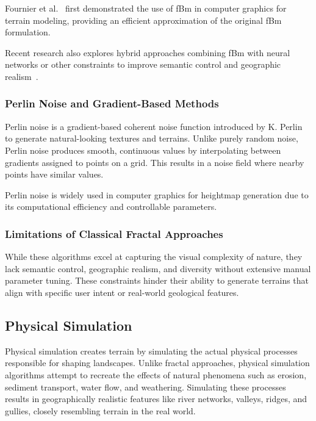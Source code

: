 Fournier et al.~\cite{fournier1982computer} first demonstrated the use of fBm in computer graphics for terrain modeling, providing an efficient approximation of the original fBm formulation.

Recent research also explores hybrid approaches combining fBm with neural networks or other constraints to improve semantic control and geographic realism~\cite{Cuadros2025TerrainGU}.

\subsubsection{Perlin Noise and Gradient-Based Methods}

Perlin noise is a gradient-based coherent noise function introduced by K. Perlin~\cite{perlin1985noise} to generate natural-looking textures and terrains. Unlike purely random noise, Perlin noise produces smooth, continuous values by interpolating between gradients assigned to points on a grid. This results in a noise field where nearby points have similar values.

Perlin noise is widely used in computer graphics for heightmap generation due to its computational efficiency and controllable parameters.

\subsubsection{Limitations of Classical Fractal Approaches}

While these algorithms excel at capturing the visual complexity of nature, they lack semantic control, geographic realism, and diversity without extensive manual parameter tuning. These constraints hinder their ability to generate terrains that align with specific user intent or real-world geological features.

\subsection{Physical Simulation}
\label{subsec:physical_simulation}

Physical simulation creates terrain by simulating the actual physical processes responsible for shaping landscapes. Unlike fractal approaches, physical simulation algorithms attempt to recreate the effects of natural phenomena such as erosion, sediment transport, water flow, and weathering. Simulating these processes results in geographically realistic features like river networks, valleys, ridges, and gullies, closely resembling terrain in the real world.

